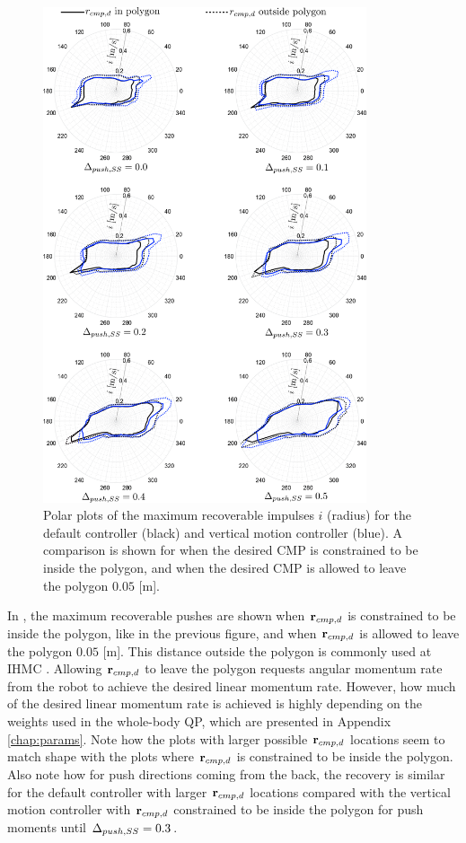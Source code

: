 \begin{figure}
     \centering
        \includegraphics[width=0.85\textwidth]{STYLESTUFF/roundAng.png}
        \caption{Polar plots of the maximum recoverable impulses $i$ (radius) for the default controller (black) and vertical motion controller (blue). A comparison is shown for when the desired \ac{CMP} is constrained to be inside the polygon, and when the desired \ac{CMP} is allowed to leave the polygon $0.05$ [m].}
        \label{fig:roundPushAng}
\end{figure}

In , the maximum recoverable pushes are shown when $\mathbf{r}_{cmp,d}$ is constrained to be inside the polygon, like in the previous figure, and when $\mathbf{r}_{cmp,d}$ is allowed to leave the polygon $0.05$ [m]. This distance outside the polygon is commonly used at \ac{IHMC} \cite{griffin2017natural}. Allowing $\mathbf{r}_{cmp,d}$ to leave the polygon requests angular momentum rate from the robot to achieve the desired linear momentum rate. However, how much of the desired linear momentum rate is achieved is highly depending on the weights used in the whole-body \ac{QP}, which are presented in Appendix \ref{chap:params}. Note how the plots with larger possible $\mathbf{r}_{cmp,d}$ locations seem to match shape with the plots where $\mathbf{r}_{cmp,d}$ is constrained to be inside the polygon. Also note how for push directions coming from the back, the recovery is similar for the default controller with larger $\mathbf{r}_{cmp,d}$ locations compared with the vertical motion controller with $\mathbf{r}_{cmp,d}$ constrained to be inside the polygon for push moments until $\Delta_{push,SS}=0.3$. 

